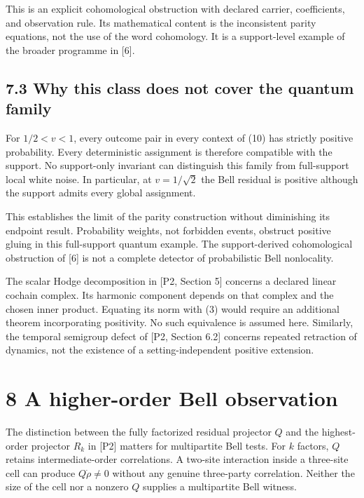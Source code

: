 \documentclass[
]{article}
\begin{document}
This is an explicit cohomological obstruction with declared carrier, coefficients, and observation rule. Its mathematical content is the inconsistent parity equations, not the use of the word cohomology. It is a support-level example of the broader programme in {[}6{]}.

\subsection{7.3 Why this class does not cover the quantum family}\label{why-this-class-does-not-cover-the-quantum-family}

For \(1/2<v<1\), every outcome pair in every context of (10) has strictly positive probability. Every deterministic assignment is therefore compatible with the support. No support-only invariant can distinguish this family from full-support local white noise. In particular, at \(v=1/\sqrt2\) the Bell residual is positive although the support admits every global assignment.

This establishes the limit of the parity construction without diminishing its endpoint result. Probability weights, not forbidden events, obstruct positive gluing in this full-support quantum example. The support-derived cohomological obstruction of {[}6{]} is not a complete detector of probabilistic Bell nonlocality.

The scalar Hodge decomposition in {[}P2, Section 5{]} concerns a declared linear cochain complex. Its harmonic component depends on that complex and the chosen inner product. Equating its norm with (3) would require an additional theorem incorporating positivity. No such equivalence is assumed here. Similarly, the temporal semigroup defect of {[}P2, Section 6.2{]} concerns repeated retraction of dynamics, not the existence of a setting-independent positive extension.

\section{8 A higher-order Bell observation}\label{a-higher-order-bell-observation}

The distinction between the fully factorized residual projector \(Q\) and the highest-order projector \(R_k\) in {[}P2{]} matters for multipartite Bell tests. For \(k\) factors, \(Q\) retains intermediate-order correlations. A two-site interaction inside a three-site cell can produce \(Q\dot\rho\ne0\) without any genuine three-party correlation. Neither the size of the cell nor a nonzero \(Q\) supplies a multipartite Bell witness.
\end{document}
